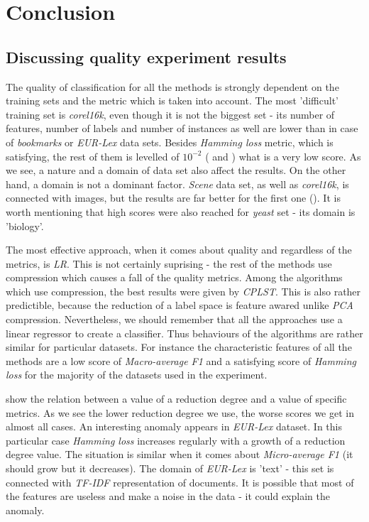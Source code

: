 \chapter{Conclusion}

\section{Discussing quality experiment results}

The quality of classification for all the methods is strongly dependent on the training sets and the metric which is taken into account. The most 'difficult' training set is \textit{corel16k}, even though it is not the biggest set - its number of features, number of labels and number of instances as well are lower than in case of \textit{bookmarks} or \textit{EUR-Lex} data sets. Besides \textit{Hamming loss} metric, which is satisfying, the rest of them is levelled of $10^{-2}$ ( and ) what is a very low score. As we see, a nature and a domain of data set also affect the results. On the other hand, a domain is not a dominant factor. \textit{Scene} data set, as well as \textit{corel16k}, is connected with images, but the results are far better for the first one (). It is worth mentioning that high scores were also reached for \textit{yeast} set - its domain is 'biology'.

The most effective approach, when it comes about quality and regardless of the metrics, is \textit{LR}. This is not certainly suprising - the rest of the methods use compression which causes a fall of the quality metrics. Among the algorithms which use compression, the best results were given by \textit{CPLST}. This is also rather predictible, because the reduction of a label space is feature awared unlike \textit{PCA} compression. Nevertheless, we should remember that all the approaches use a linear regressor to create a classifier. Thus behaviours of the algorithms are rather similar for particular datasets. For instance the characteristic features of all the methods are a low score of \textit{Macro-average F1} and a satisfying score of \textit{Hamming loss} for the majority of the datasets used in the experiment. 

 show the relation between a value of a reduction degree and a value of specific metrics. As we see the lower reduction degree we use, the worse scores we get in almost all cases. An interesting anomaly appears in \textit{EUR-Lex} dataset. In this particular case \textit{Hamming loss} increases regularly with a growth of a reduction degree value. The situation is similar when it comes about \textit{Micro-average F1} (it should grow but it decreases). The domain of \textit{EUR-Lex} is 'text' - this set is connected with \textit{TF-IDF} representation of documents. It is possible that most of the features are useless and make a noise in the data - it could explain the anomaly.  

